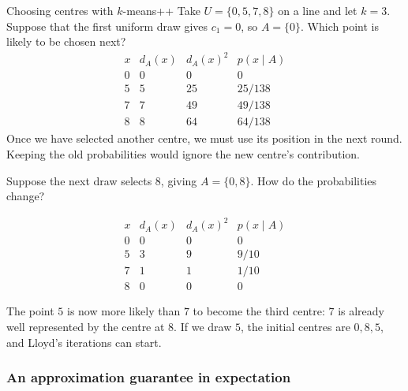 \documentclass[a4paper,12pt,oneside]{report}
\begin{document}
\begin{framedexample}{Choosing centres with $k$-means++}
\label{ex:kmeanspp-first-choice}
Take $U=\{0,5,7,8\}$ on a line and let $k=3$. Suppose that the first
uniform draw gives $c_1=0$, so $A=\{0\}$. Which point is likely to
be chosen next?
\[
\begin{array}{c|ccc}
  x & d_A(x) & d_A(x)^2 & p(x\mid A)\\
  \hline
  0 & 0 & 0  & 0\\
  5 & 5 & 25 & 25/138\\
  7 & 7 & 49 & 49/138\\
  8 & 8 & 64 & 64/138
\end{array}
\]
Once we have selected another centre, we must use its position in
the next round. Keeping the old probabilities would ignore the new
centre's contribution.

Suppose the next draw selects $8$, giving $A=\{0,8\}$.
How do the probabilities change?

\[
\begin{array}{c|ccc}
  x & d_A(x) & d_A(x)^2 & p(x\mid A)\\
  \hline
  0 & 0 & 0 & 0\\
  5 & 3 & 9 & 9/10\\
  7 & 1 & 1 & 1/10\\
  8 & 0 & 0 & 0
\end{array}
\]
\begin{center}
\end{center}
The point $5$ is now more likely than $7$ to become the third centre:
$7$ is already well represented by the centre at $8$. If we draw $5$,
the initial centres are $0,8,5$, and Lloyd's iterations can start.
\end{framedexample}

\subsubsection{An approximation guarantee in expectation}
\label{sec:kmeanspp-guarantee}
\end{document}
